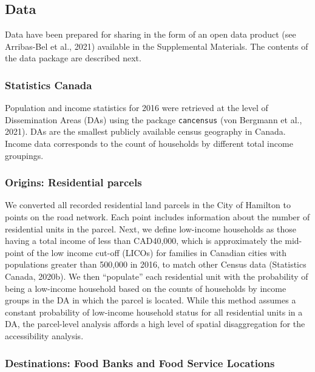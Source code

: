\documentclass[]{elsarticle} %
\begin{document}
\hypertarget{data}{%
\subsection{Data}\label{data}}

Data have been prepared for sharing in the form of an open data product
(see Arribas-Bel et al., 2021) available in the Supplemental Materials.
The contents of the data package are described next.

\hypertarget{statistics-canada}{%
\subsubsection{Statistics Canada}\label{statistics-canada}}

Population and income statistics for 2016 were retrieved at the level of
Dissemination Areas (DAs) using the package \texttt{cancensus} (von
Bergmann et al., 2021). DAs are the smallest publicly available census
geography in Canada. Income data corresponds to the count of households
by different total income groupings.

\hypertarget{origins-residential-parcels}{%
\subsubsection{Origins: Residential
parcels}\label{origins-residential-parcels}}

We converted all recorded residential land parcels in the City of
Hamilton to points on the road network. Each point includes information
about the number of residential units in the parcel. Next, we define
low-income households as those having a total income of less than
CAD40,000, which is approximately the mid-point of the low income
cut-off (LICOs) for families in Canadian cities with populations greater
than 500,000 in 2016, to match other Census data (Statistics Canada,
2020b). We then ``populate'' each residential unit with the probability
of being a low-income household based on the counts of households by
income groups in the DA in which the parcel is located. While this
method assumes a constant probability of low-income household status for
all residential units in a DA, the parcel-level analysis affords a high
level of spatial disaggregation for the accessibility analysis.

\hypertarget{destinations-food-banks-and-food-service-locations}{%
\subsubsection{Destinations: Food Banks and Food Service
Locations}\label{destinations-food-banks-and-food-service-locations}}
\end{document}
